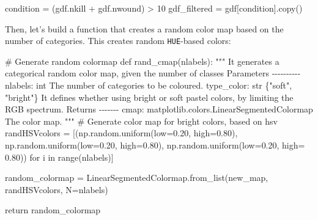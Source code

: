 \documentclass[
  letterpaper,
  DIV=11,
  numbers=noendperiod]{scrreprt}
\newenvironment{Shaded}{\begin{snugshade}}{\end{snugshade}}
\newcommand{\BuiltInTok}[1]{\textcolor[rgb]{0.00,0.23,0.31}{#1}}
\newcommand{\CommentTok}[1]{\textcolor[rgb]{0.37,0.37,0.37}{#1}}
\newcommand{\ControlFlowTok}[1]{\textcolor[rgb]{0.00,0.23,0.31}{#1}}
\newcommand{\DecValTok}[1]{\textcolor[rgb]{0.68,0.00,0.00}{#1}}
\newcommand{\FloatTok}[1]{\textcolor[rgb]{0.68,0.00,0.00}{#1}}
\newcommand{\KeywordTok}[1]{\textcolor[rgb]{0.00,0.23,0.31}{#1}}
\newcommand{\NormalTok}[1]{\textcolor[rgb]{0.00,0.23,0.31}{#1}}
\newcommand{\OperatorTok}[1]{\textcolor[rgb]{0.37,0.37,0.37}{#1}}
\newcommand{\StringTok}[1]{\textcolor[rgb]{0.13,0.47,0.30}{#1}}
\begin{document}
\begin{Shaded}
\begin{Highlighting}[]
\NormalTok{condition }\OperatorTok{=}\NormalTok{ (gdf.nkill }\OperatorTok{+}\NormalTok{ gdf.nwound) }\OperatorTok{\textgreater{}} \DecValTok{10}
\NormalTok{gdf\_filtered }\OperatorTok{=}\NormalTok{ gdf[condition].copy()}
\end{Highlighting}
\end{Shaded}

Then, let's build a function that creates a random color map based on
the number of categories. This creates random \texttt{HUE}-based colors:

\begin{Shaded}
\begin{Highlighting}[]
\CommentTok{\# Generate random colormap}
\KeywordTok{def}\NormalTok{ rand\_cmap(nlabels):}
    \CommentTok{""" }
\CommentTok{    It generates a categorical random color map, given the number of classes}
\CommentTok{    }
\CommentTok{    Parameters}
\CommentTok{    {-}{-}{-}{-}{-}{-}{-}{-}{-}{-}}
\CommentTok{    nlabels: int}
\CommentTok{        The number of categories to be coloured.}
\CommentTok{    type\_color: str \{"soft", "bright"\} }
\CommentTok{        It defines whether using bright or soft pastel colors, by limiting the RGB spectrum.}
\CommentTok{       }
\CommentTok{    Returns}
\CommentTok{    {-}{-}{-}{-}{-}{-}{-}}
\CommentTok{    cmap: matplotlib.colors.LinearSegmentedColormap}
\CommentTok{        The color map.}
\CommentTok{    """}   
    \CommentTok{\# Generate color map for bright colors, based on hsv}
\NormalTok{    randHSVcolors }\OperatorTok{=}\NormalTok{ [(np.random.uniform(low}\OperatorTok{=}\FloatTok{0.20}\NormalTok{, high}\OperatorTok{=}\FloatTok{0.80}\NormalTok{),}
\NormalTok{                          np.random.uniform(low}\OperatorTok{=}\FloatTok{0.20}\NormalTok{, high}\OperatorTok{=}\FloatTok{0.80}\NormalTok{),}
\NormalTok{                          np.random.uniform(low}\OperatorTok{=}\FloatTok{0.20}\NormalTok{, high}\OperatorTok{=} \FloatTok{0.80}\NormalTok{)) }\ControlFlowTok{for}\NormalTok{ i }\KeywordTok{in} \BuiltInTok{range}\NormalTok{(nlabels)]}

\NormalTok{    random\_colormap }\OperatorTok{=}\NormalTok{ LinearSegmentedColormap.from\_list(}\StringTok{\textquotesingle{}new\_map\textquotesingle{}}\NormalTok{, randHSVcolors, N}\OperatorTok{=}\NormalTok{nlabels)}
   
    \ControlFlowTok{return}\NormalTok{ random\_colormap }
\end{Highlighting}
\end{Shaded}
\end{document}
